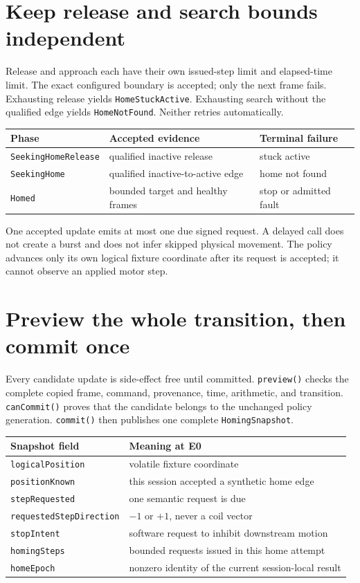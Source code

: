 \documentclass[10pt]{article}
\begin{document}
\section{Keep release and search bounds independent}
Release and approach each have their own issued-step limit and elapsed-time
limit. The exact configured boundary is accepted; only the next frame fails.
Exhausting release yields \texttt{HomeStuckActive}. Exhausting search without
the qualified edge yields \texttt{HomeNotFound}. Neither retries
automatically.

\begin{tabularx}{\linewidth}{@{}l X X@{}}
\toprule
Phase & Accepted evidence & Terminal failure\\
\midrule
\texttt{SeekingHomeRelease} & qualified inactive release & stuck active\\
\texttt{SeekingHome} & qualified inactive-to-active edge & home not found\\
\texttt{Homed} & bounded target and healthy frames & stop or admitted fault\\
\bottomrule
\end{tabularx}

One accepted update emits at most one due signed request. A delayed call does
not create a burst and does not infer skipped physical movement. The policy
advances only its own logical fixture coordinate after its request is
accepted; it cannot observe an applied motor step.

\section{Preview the whole transition, then commit once}
Every candidate update is side-effect free until committed.
\texttt{preview()} checks the complete copied frame, command, provenance,
time, arithmetic, and transition. \texttt{canCommit()} proves that the
candidate belongs to the unchanged policy generation. \texttt{commit()} then
publishes one complete \texttt{HomingSnapshot}.

\begin{tabularx}{\linewidth}{@{}l X@{}}
\toprule
Snapshot field & Meaning at E0\\
\midrule
\texttt{logicalPosition} & volatile fixture coordinate\\
\texttt{positionKnown} & this session accepted a synthetic home edge\\
\texttt{stepRequested} & one semantic request is due\\
\texttt{requestedStepDirection} & \(-1\) or \(+1\), never a coil vector\\
\texttt{stopIntent} & software request to inhibit downstream motion\\
\texttt{homingSteps} & bounded requests issued in this home attempt\\
\texttt{homeEpoch} & nonzero identity of the current session-local result\\
\bottomrule
\end{tabularx}
\end{document}
